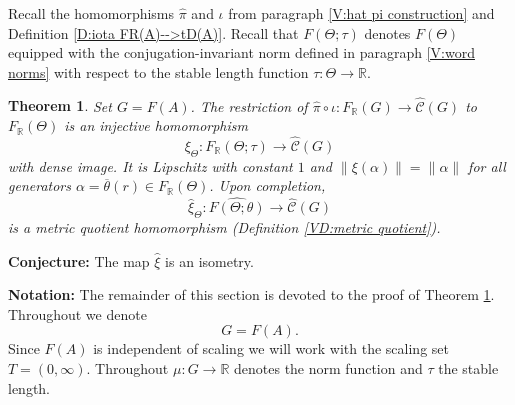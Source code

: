 \documentclass[12pt]{amsart}
\newtheorem{theorem}[prop]{Theorem}
\newtheorem*{conjx}{Conjecture}
\theoremstyle{definition}
\newtheorem*{notationx}{Notation}
\def\RR{\ensuremath{\mathbb{R}}}
\def\Free{F}
\def\tC{\hat{\mathcal{C}}}
\begin{document}
Recall the homomorphisms $\hat{\pi}$ and $\iota$ from paragraph \ref{V:hat pi construction} and Definition  \ref{D:iota FR(A)-->tD(A)}.
Recall that $\Free(\Theta;\tau)$ denotes $\Free(\Theta)$ equipped with the conjugation-invariant norm defined in paragraph \ref{V:word norms} with respect to the stable length function $\tau \colon \Theta \to \RR$.



\begin{theorem}\label{theorem:F(Theta) to tC(Free)}
Set $G=\Free(A)$.
The restriction of $\hat{\pi} \circ \iota \colon \Free_\RR(G) \to \tC(G)$ to $\Free_\RR(\Theta)$ is an {\em injective} homomorphism
\[
\xi_\Theta \colon \Free_\RR(\Theta;\tau) \to \tC(G)
\]
with dense image.
It is Lipschitz with constant $1$ and $\|\xi(\alpha)\|=\|\alpha\|$ for all generators $\alpha=\overline{\theta}(r) \in \Free_\RR(\Theta)$.
Upon completion,
\[
\hat{\xi}_\Theta \colon \widehat{\Free(\Theta;\theta)} \to \tC(G)
\]
is a metric quotient homomorphism (Definition \ref{VD:metric quotient}).
\end{theorem}


\medskip
\noindent
{\bf Conjecture:}
The map $\hat{\xi}$ is an isometry.

\medskip
\noindent
{\bf Notation:}
The remainder of this section is devoted to the proof of Theorem \ref{theorem:F(Theta) to tC(Free)}.
Throughout we denote
\[
G=\Free(A).
\]
Since $\Free(A)$ is independent of scaling we will work with the scaling set $T=(0,\infty)$.
Throughout $\mu \colon G \to \RR$ denotes the norm function and $\tau$ the stable length.
\end{document}
